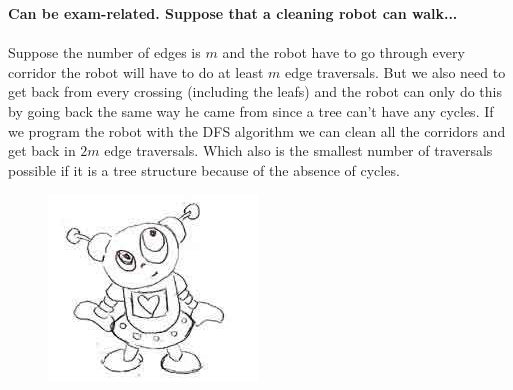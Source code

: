 \documentclass[12pt,oneside,reqno]{amsart}
\begin{document}
\textbf{Can be exam-related. Suppose that a cleaning robot can walk...}\\\\
Suppose the number of edges is $m$ and the robot have to go through every corridor the robot will have to do at least $m$ edge traversals. But we also need to get back from every crossing (including the leafs) and the robot can only do this by going back the same way he came from since a tree can't have any cycles. If we program the robot with the DFS algorithm we can clean all the corridors and get back in $2m$ edge traversals. Which also is the smallest number of traversals possible if it is a tree structure because of the absence of cycles.
\begin{figure}[b]
    \href{https://www.youtube.com/watch?v=tLt5rBfNucc}
         {\includegraphics[scale=0.5]{robot}}
\end{figure}\\
\end{document}
